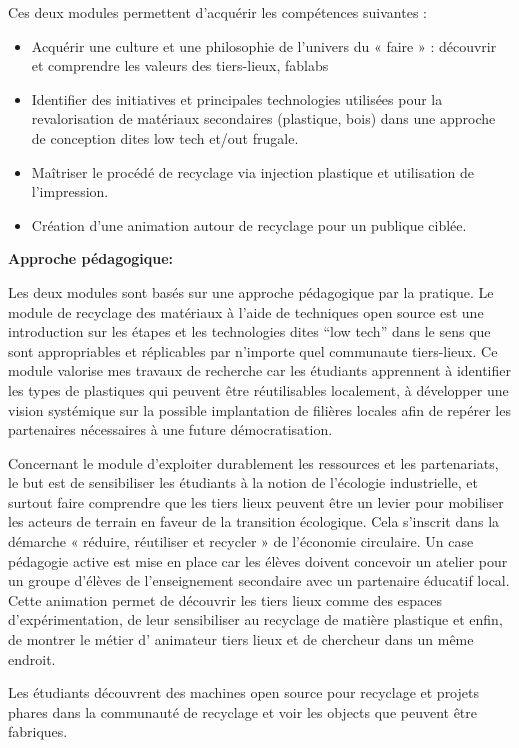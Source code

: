 \documentclass[
  11pt,
]{article}
\providecommand{\tightlist}{%
  \setlength{\itemsep}{0pt}\setlength{\parskip}{0pt}}\usepackage{longtable,booktabs,array}
\begin{document}
Ces deux modules permettent d'acquérir les compétences suivantes :

\begin{itemize}
\tightlist
\item
  Acquérir une culture et une philosophie de l'univers du « faire » :
  découvrir et comprendre les valeurs des tiers-lieux, fablabs
\item
  Identifier des initiatives et principales technologies utilisées pour
  la revalorisation de matériaux secondaires (plastique, bois) dans une
  approche de conception dites low tech et/out frugale.
\item
  Maîtriser le procédé de recyclage via injection plastique et
  utilisation de l'impression.
\item
  Création d'une animation autour de recyclage pour un publique ciblée.
\end{itemize}

\textbf{Approche pédagogique: }

Les deux modules sont basés sur une approche pédagogique par la
pratique. Le module de recyclage des matériaux à l'aide de techniques
open source est une introduction sur les étapes et les technologies
dites ``low tech'' dans le sens que sont appropriables et réplicables
par n'importe quel communaute tiers-lieux. Ce module valorise mes
travaux de recherche car les étudiants apprennent à identifier les types
de plastiques qui peuvent être réutilisables localement, à développer
une vision systémique sur la possible implantation de filières locales
afin de repérer les partenaires nécessaires à une future
démocratisation.

Concernant le module d'exploiter durablement les ressources et les
partenariats, le but est de sensibiliser les étudiants à la notion de
l'écologie industrielle, et surtout faire comprendre que les tiers lieux
peuvent être un levier pour mobiliser les acteurs de terrain en faveur
de la transition écologique. Cela s'inscrit dans la démarche « réduire,
réutiliser et recycler » de l'économie circulaire. Un case pédagogie
active est mise en place car les élèves doivent concevoir un atelier
pour un groupe d'élèves de l'enseignement secondaire avec un partenaire
éducatif local. Cette animation permet de découvrir les tiers lieux
comme des espaces d'expérimentation, de leur sensibiliser au recyclage
de matière plastique et enfin, de montrer le métier d' animateur tiers
lieux et de chercheur dans un même endroit.

Les étudiants découvrent des machines open source pour recyclage et
projets phares dans la communauté de recyclage et voir les objects que
peuvent être fabriques.
\end{document}

